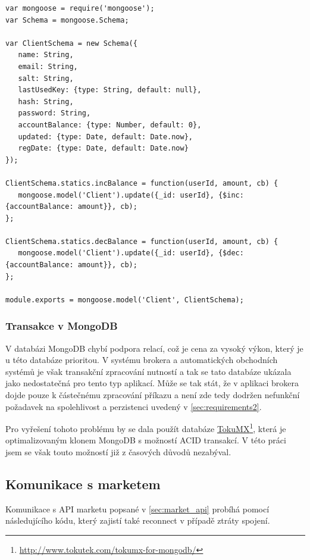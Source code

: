 \documentclass[thesis=M,czech]{FITthesis}[2012/06/26]
\newcommand\fnurl[2]{\href{#2}{#1}\footnote{\url{#2}}}
\begin{document}
	
\begin{lstlisting}[basicstyle={\tiny\ttfamily}, frame=single] 
var mongoose = require('mongoose');
var Schema = mongoose.Schema;
 
var ClientSchema = new Schema({
   name: String,
   email: String,
   salt: String,
   lastUsedKey: {type: String, default: null},
   hash: String,
   password: String,
   accountBalance: {type: Number, default: 0},
   updated: {type: Date, default: Date.now},
   regDate: {type: Date, default: Date.now}
});

ClientSchema.statics.incBalance = function(userId, amount, cb) {
   mongoose.model('Client').update({_id: userId}, {$inc: {accountBalance: amount}}, cb);
};

ClientSchema.statics.decBalance = function(userId, amount, cb) {
   mongoose.model('Client').update({_id: userId}, {$dec: {accountBalance: amount}}, cb);
};

module.exports = mongoose.model('Client', ClientSchema);
\end{lstlisting}
	
	
\subsubsection{Transakce v MongoDB}
	
	V databázi MongoDB chybí podpora relací, což je cena za vysoký výkon, který je u této databáze prioritou. V systému brokera a automatických obchodních systémů je však transakční zpracování nutností a tak se tato databáze ukázala jako nedostatečná pro tento typ aplikací. Může se tak stát, že v aplikaci brokera dojde pouze k částečnému zpracování příkazu a není zde tedy dodržen nefunkční požadavek na spolehlivost a perzistenci uvedený v \ref{sec:requirements2}.

	Pro vyřešení tohoto problému by se dala použít databáze \fnurl{TokuMX}{http://www.tokutek.com/tokumx-for-mongodb/}, která je optimalizovaným klonem MongoDB s možností ACID transakcí. V této práci jsem se však touto možností již z časových důvodů nezabýval.
	
\subsection{Komunikace s marketem}

	Komunikace s API marketu popsané v \ref{sec:market_api} probíhá pomocí následujícího kódu, který zajistí také reconnect v případě ztráty spojení.
\end{document}
